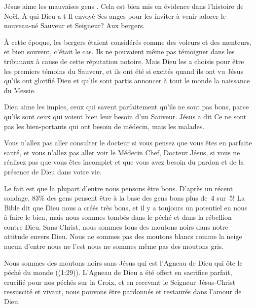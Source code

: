 

Jésus aime les \Og mauvaises gens \Fg{}. Cela est bien mis en évidence dans l'histoire de Noël. À qui Dieu a-t-Il envoyé Ses anges pour les inviter à venir adorer le nouveau-né Sauveur et Seigneur? Aux bergers.

À cette époque, les bergers étaient considérés comme des voleurs et des menteurs, et bien souvent, c'était le cas. Ils ne pouvaient même pas témoigner dans les tribunaux à cause de cette réputation notoire. Mais Dieu les a choisis pour être les premiers témoins du Sauveur, et ils ont été si excités quand ils ont vu Jésus qu'ils ont glorifié Dieu et qu'ils sont partis annoncer à tout le monde la naissance du Messie.

Dieu aime les impies, ceux qui savent parfaitement qu'ils ne sont pas bons, parce qu'ils sont ceux qui voient bien leur besoin d'un Sauveur. Jésus a dit\frcolon{} \Og Ce ne sont pas les bien-portants qui ont besoin de médecin, mais les malades. \Fg{}

Vous n'allez pas aller consulter le docteur si vous pensez que vous êtes en parfaite santé, et vous n'allez pas aller voir le Médecin Chef, Docteur Jésus, si vous ne réalisez pas que vous êtes incomplet et que vous avez besoin du pardon et de la présence de Dieu dans votre vie.

Le fait est que la plupart d'entre nous pensons être bons. D'après un récent sondage, 83\% des gens pensent être à la base des gens bons \ocadr plus de~4 sur~5! La Bible dit que Dieu nous a créés très bons, et il y a toujours un potentiel en nous à faire le bien, mais nous sommes tombés dans le péché et dans la rébellion contre Dieu. Sans Christ, nous sommes tous des moutons noirs dans notre attitude envers Dieu. Nous ne sommes pas des moutons blancs comme la neige \ocadr aucun d'entre nous ne l'est \fcadr{} nous ne sommes même pas des moutons gris.

Nous sommes des moutons noirs sans Jésus qui est \Og l'Agneau de Dieu qui ôte le péché du monde \Fg{} ((1:29)). L'Agneau de Dieu a été offert en sacrifice parfait, crucifié pour nos péchés sur la Croix, et en recevant le Seigneur Jésus-Christ ressuscité et vivant, nous pouvons être pardonnés et restaurés dans l'amour de Dieu.

